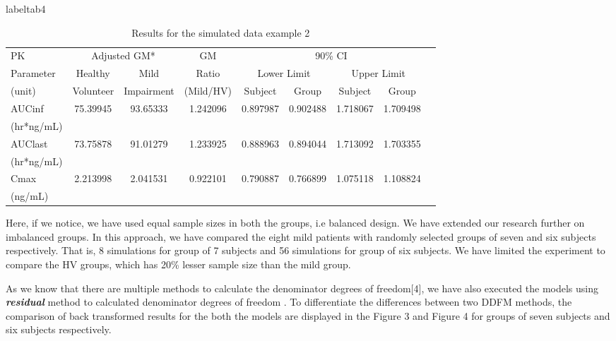 \documentclass[final]{statistica}
\begin{document}
\begin{table}
	\centering
	\caption{Results for the simulated data example 2}label{tab4}
	\begin{tabular}{|l|c|c|c|c|c|c|c|c|}
		\hline
		PK & \multicolumn{2}{c|}{Adjusted GM*} & GM & \multicolumn{4}{c|}{90\% CI} \\
		\cline{2-3} \cline{5-8}
		Parameter & Healthy & Mild & Ratio & \multicolumn{2}{c|}{Lower Limit} & \multicolumn{2}{c|}{Upper Limit} \\ \cline{5-8}
		(unit) & Volunteer & Impairment & (Mild/HV) & Subject & Group & Subject & Group \\
		\hline
		AUCinf & \multirow{2}{*}{75.39945} & \multirow{2}{*}{93.65333} & \multirow{2}{*}{1.242096} & \multirow{2}{*}{0.897987} & \multirow{2}{*}{0.902488} & \multirow{2}{*}{1.718067} & \multirow{2}{*}{1.709498} \\
		(hr*ng/mL) & & & & & & & \\ \hline
		AUClast & \multirow{2}{*}{73.75878} & \multirow{2}{*}{91.01279} & \multirow{2}{*}{1.233925} & \multirow{2}{*}{0.888963} & \multirow{2}{*}{0.894044} & \multirow{2}{*}{1.713092} & \multirow{2}{*}{1.703355} \\
		(hr*ng/mL) & & & & & & & \\ \hline
		Cmax & \multirow{2}{*}{2.213998} & \multirow{2}{*}{2.041531} & \multirow{2}{*}{0.922101} & \multirow{2}{*}{0.790887} & \multirow{2}{*}{0.766899} & \multirow{2}{*}{1.075118} & \multirow{2}{*}{1.108824} \\
		(ng/mL) & & & & & & & \\ \hline
	\end{tabular}
\end{table}

\vspace{3mm}
\par
Here, if we notice, we have used equal sample sizes in both the groups, i.e balanced design. We have extended our research further on imbalanced groups. In this approach, we have compared the eight mild patients with randomly selected groups of seven and six subjects respectively. That is, 8 simulations for group of 7 subjects and 56 simulations for group of six subjects. We have limited the experiment to compare the HV groups, which has 20\% lesser sample size than the mild group.
\vspace{3mm}
\par
As we know that there are multiple methods to calculate the denominator degrees of freedom[4], we have also executed the models using \textit{\textbf{residual}} method to calculated denominator degrees of freedom . To differentiate the differences between two DDFM methods, the comparison of back transformed results for the both the models are displayed in the Figure 3 and Figure 4 for groups of seven subjects and six subjects respectively.
\end{document}
